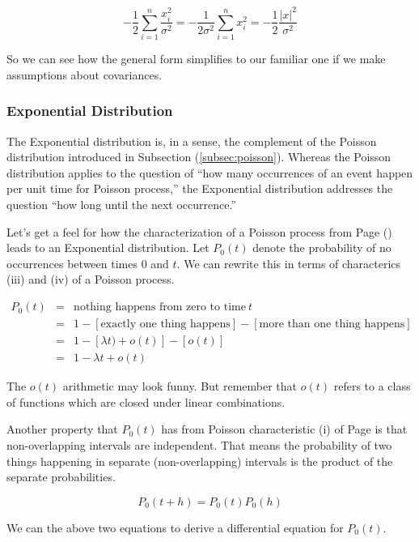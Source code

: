 \documentclass[]{article}
\begin{document}
$$
-\frac{1}{2} \sum_{i=1}^n \frac{x_i^2}{\sigma^2} =
-\frac{1}{2\sigma^2} \sum_{i=1}^n x_i^2 =
-\frac{1}{2} \frac{|x|^2}{\sigma^2}
$$

So we can see how the general form simplifies to our
familiar one if we make assumptions about covariances.

\subsubsection{Exponential Distribution}

The Exponential distribution is, in a sense, the complement of
the Poisson distribution introduced in 
Subsection (\ref{subsec:poisson}).  Whereas the Poisson
distribution applies to the question of ``how many occurrences
of an event happen per unit time for Poisson process,'' 
the Exponential distribution addresses the question 
``how long until the next occurrence.''

Let's get a feel for how the characterization of a Poisson 
process from
Page (\pageref{poisson_properties}) leads to an Exponential
distribution.  Let $P_0(t)$ denote the probability of no
occurrences between times 0 and $t$.  We can rewrite this
in terms of characterics (iii) and (iv) of a Poisson process.

\begin{eqnarray*}
P_0(t) &= & \mbox{nothing happens from zero to time} \: t \\
  &= & 1 - [\mbox{exactly one thing happens}] - 
     [ \mbox{more than one thing happens} ] \\
  &= & 1 - [\lambda t) + o(t)] - [ o(t) ] \\
  &= & 1 - \lambda t + o(t)
\end{eqnarray*}

The $o(t)$ arithmetic may look funny.  But remember that $o(t)$
refers to a class of functions which are closed under linear
combinations.

Another property that $P_0(t)$ has from Poisson characteristic
(i) of Page \pageref{poisson_properties} is that non-overlapping
intervals are independent.  That means the probability of two
things happening in separate (non-overlapping) intervals is the
product of the separate probabilities.

$$
P_0(t+h) = P_0(t)P_0(h)
$$

We can the above two equations to derive a differential equation
for $P_0(t)$.
\end{document}
